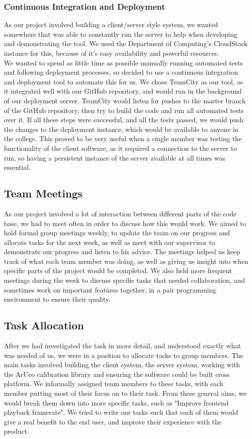 \documentclass{article}
\begin{document}
\subsubsection{Continuous Integration and Deployment}
As our project involved building a client/server style system, we wanted somewhere that was able to constantly run the server to help when developing and demonstrating the tool. We used the Department of Computing's CloudStack instance for this, because of it's easy availability and powerful resources. \\
We wanted to spend as little time as possible manually running automated tests and following deployment processes, so decided to use a continuous integration and deployment tool to automate this for us. We chose TeamCity as our tool, as it integrated well with our GitHub repository, and would run in the background of our deployment server. TeamCity would listen for pushes to the master branch of the GitHub repository, then try to build the code and run all automated tests over it. If all these steps were successful, and all the tests passed, we would push the changes to the deployment instance, which would be available to anyone in the college. This proved to be very useful when a single member was testing the functionality of the client software, as it required a connection to the server to run, so having a persistent instance of the server available at all times was essential.  
\subsection{Team Meetings}
As our project involved a lot of interaction between different parts of the code base, we had to meet often in order to discuss how this would work. We aimed to hold formal group meetings weekly, to update the team on our progress and allocate tasks for the next week, as well as meet with our supervisor to demonstrate our progress and listen to his advice. The meetings helped us keep track of what each team member was doing, as well as giving us insight into when specific parts of the project would be completed. We also held more frequent meetings during the week to discuss specific tasks that needed collaboration, and sometimes work on important features together, in a pair programming environment to ensure their quality. 
\subsection{Task Allocation}
After we had investigated the task in more detail, and understood exactly what was needed of us, we were in a position to allocate tasks to group members. The main tasks involved building the client system, the server system, working with the ArUco calibration library and ensuring the software could be built cross platform. We informally assigned team members to these tasks, with each member putting most of their focus on to their task. From these general aims, we would break them down into more specific tasks, such as "Improve frontend playback framerate". We tried to write our tasks such that each of them would give a real benefit to the end user, and improve their experience with the product. 
\newpage
\end{document}
